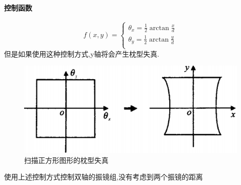 \documentclass[a4paper,12pt,onecolumn,twoside]{article}
\begin{document}
\paragraph{控制函数}
\begin{equation}
f(x,y)=
\left\{
\begin{array}{l}
\theta_x = \frac{1}{2}\arctan\frac{x}{d}  \\
\theta_y = \frac{1}{2}\arctan\frac{y}{d} \\
\end{array}
\right.
\end{equation}
但是如果使用这种控制方式,y轴将会产生枕型失真.
\begin{figure}[ht]
\centering
\includegraphics[width=\linewidth]{MG5.png}
\caption{扫描正方形图形的枕型失真}
\end{figure}
\newpage
使用上述控制方式控制双轴的振镜组,没有考虑到两个振镜的距离
\end{document}
